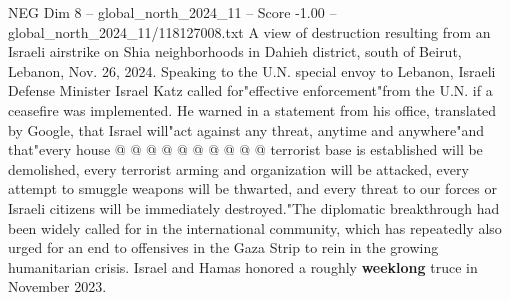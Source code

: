 \begin{textsample}{NEG Dim 8 – global\_north\_2024\_11 – Score -1.00 – global\_north\_2024\_11/118127008.txt}
A view of destruction resulting from an Israeli airstrike on Shia neighborhoods in Dahieh district, south of Beirut, Lebanon, Nov. 26, 2024.
Speaking to the U.N. special envoy to Lebanon, Israeli Defense Minister Israel Katz called for"effective enforcement"from the U.N. if a ceasefire was implemented.
He warned in a statement from his office, translated by Google, that Israel will"act against any threat, anytime and anywhere"and that"every house @ @ @ @ @ @ @ @ @ @ terrorist base is established will be demolished, every terrorist arming and organization will be attacked, every attempt to smuggle weapons will be thwarted, and every threat to our forces or Israeli citizens will be immediately destroyed."The diplomatic breakthrough had been widely called for in the international community, which has repeatedly also urged for an end to offensives in the Gaza Strip to rein in the growing humanitarian crisis.
Israel and Hamas honored a roughly \textbf{weeklong} truce in November 2023.

\end{textsample}

